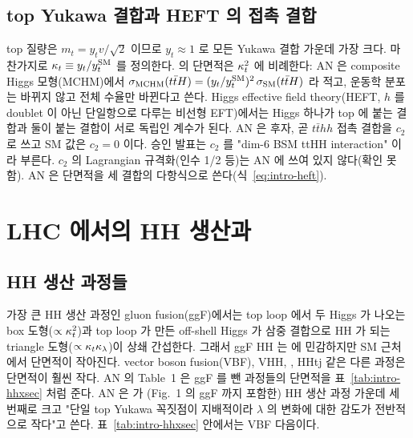 \subsection{top Yukawa 결합과 HEFT 의 접촉 결합}

top 질량은 $m_t = y_t v/\sqrt{2}$ 이므로 $y_t\approx1$ 로 모든 Yukawa 결합 가운데 가장 크다. 마찬가지로 $\kappa_{t}\equiv y_t/y_t^{\mathrm{SM}}$ 를 정의한다.
\ttH 의 단면적은 $\kappa_{t}^{2}$ 에 비례한다: AN 은 composite Higgs 모형(MCHM)에서 $\sigma_{\mathrm{MCHM}}(t\bar{t}H)=(y_t/y_t^{\mathrm{SM}})^{2}\,\sigma_{\mathrm{SM}}(t\bar{t}H)$
라 적고, 운동학 분포는 바뀌지 않고 전체 수율만 바뀐다고 쓴다. Higgs effective field theory(HEFT, $h$ 를 doublet 이
아닌 단일항으로 다루는 비선형 EFT)에서는 Higgs 하나가 top 에 붙는 결합과 둘이 붙는 결합이 서로 독립인 계수가 된다. AN 은 후자, 곧
$t\bar t hh$ 접촉 결합을 $c_2$ 로 쓰고 SM 값은 $c_2=0$ 이다. 승인 발표는 $c_2$ 를 "dim-6 BSM ttHH interaction" 이라 부른다. $c_2$ 의 Lagrangian 규격화(인수 1/2 등)는 AN 에
쓰여 있지 않다(확인 못 함). AN 은 \ttHH 단면적을 세 결합의 다항식으로 쓴다(식~\eqref{eq:intro-heft}).

\section{LHC 에서의 HH 생산과 \texorpdfstring{\ttHH}{ttHH}}\label{sec:intro-hhprod}

\subsection{HH 생산 과정들}

가장 큰 HH 생산 과정인 gluon fusion(ggF)에서는 top loop 에서 두 Higgs 가 나오는 box 도형($\propto\kappa_{t}^2$)과 top loop 가 만든 off-shell Higgs 가
삼중 결합으로 HH 가 되는 triangle 도형($\propto\kappa_{t}\kappa_{\lambda}$)이 상쇄 간섭한다. 그래서 ggF HH 는 \kl 에 민감하지만 SM 근처에서
단면적이 작아진다. vector boson fusion(VBF), VHH, \ttHH, HHtj 같은 다른 과정은 단면적이 훨씬 작다. AN 의 Table~1 은 ggF 를 뺀 과정들의 단면적을
표~\ref{tab:intro-hhxsec} 처럼 준다. AN 은 \ttHH 가 (Fig.~1 의 ggF 까지 포함한) HH 생산 과정 가운데 세 번째로 크고 "단일 top Yukawa 꼭짓점이 지배적이라
$\lambda$ 의 변화에 대한 감도가 전반적으로 작다"고 쓴다. 표~\ref{tab:intro-hhxsec} 안에서는 VBF 다음이다.


